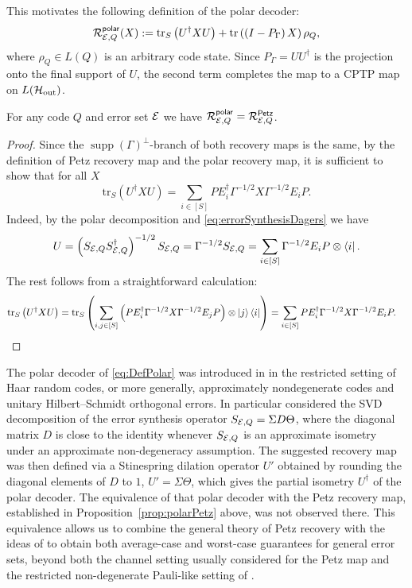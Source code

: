 \documentclass[10pt]{article}
\DeclareMathOperator{\supp}{supp}
\newcommand{\SOUT}{\mathrm{out}}
\newcommand{\tr}{\mathrm{tr}}
\newcommand{\p}[1]{\left(#1\right)}
\newcommand{\s}[1]{\mathsf{#1}}
\begin{document}
This motivates the following definition of the polar decoder:
\begin{equation}
    \calR_{\calE,Q}^{\s{polar}}(X) := \tr_S\p{U^\dag XU} +\tr\p{\p{I-P_{\Gamma}}X}\rho_Q,\label{eq:DefPolar}
\end{equation}
where $\rho_Q\in L(Q)$ is an arbitrary code state. Since $P_{\Gamma}=UU^\dag$ is the projection onto the final support of $U$, the second term completes the map to a CPTP map on $L(\calH_{\SOUT})$. 
\begin{prop}\label{prop:polarPetz} For any code $Q$ and error set ${\cal E}$ we have $ \calR_{\calE,Q}^{\s{polar}}= \calR_{\calE,Q}^{\s{Petz}}$. 
\end{prop}

\begin{proof}
    Since the $\supp(\Gamma)^\perp$-branch of both recovery maps is the same, by the definition of Petz recovery map and the polar recovery map, it is sufficient to show that for all $X$
    \[\tr_S\p{U^\dag XU}=\sum_{i\in [S]}PE_i^\dag\Gamma^{-1/2} X \Gamma^{-1/2}E_i P. \]
    Indeed, by the polar decomposition and \eqref{eq:errorSynthesisDagers}
    we have
    \[U=\p{S_{\calE,Q}S_{\calE,Q}^\dag}^{-1/2}S_{\calE,Q}=\Gamma^{-1/2}S_{\calE,Q}=\sum_{i\in [S]}\Gamma^{-1/2}E_iP\otimes \bra{i}.\]
    The rest follows from a straightforward calculation:
    \begin{align}
        \tr_S\p{U^\dag XU}&=\tr_S\p{\sum_{i,j\in [S]} \p{P E_i^\dag \Gamma^{-1/2}X\Gamma^{-1/2} E_j P} \otimes \ket{j}\bra{i} }=\sum_{i\in [S]} P E_i^\dag \Gamma^{-1/2}X\Gamma^{-1/2} E_i P.\label{eq:Utrace}
    \end{align}
\end{proof}

The polar decoder of \eqref{eq:DefPolar} was introduced in \cite{ma2025haar} in the restricted setting of Haar random codes, or more generally, approximately nondegenerate codes and unitary Hilbert--Schmidt orthogonal errors. In particular \cite{ma2025haar} considered the SVD decomposition of the error synthesis operator $S_{{\cal E},Q}=\Sigma D \Theta$, where the diagonal matrix $D$ is close to the identity whenever $S_{{\cal E},Q}$ is an approximate isometry under an approximate non-degeneracy assumption. The suggested recovery map was then defined via a Stinespring dilation operator $U'$ obtained by rounding the diagonal elements of $D$ to $1$, $U'=\Sigma \Theta$, which gives the partial isometry $U^\dag$ of the polar decoder. The equivalence of that polar decoder with the Petz recovery map, established in Proposition~\ref{prop:polarPetz} above, was not observed there. This equivalence allows us to combine the general theory of Petz recovery with the ideas of \cite{ma2025haar} to obtain both average-case and worst-case guarantees for general error sets, beyond both the channel setting usually considered for the Petz map and the restricted non-degenerate Pauli-like setting of \cite{ma2025haar}.
\end{document}
